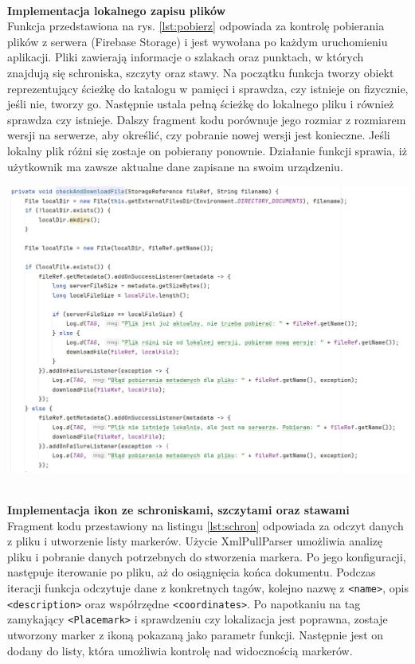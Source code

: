 \\


\textbf{Implementacja lokalnego zapisu plików} \\ 
Funkcja przedstawiona na rys. \ref{lst:pobierz} odpowiada za kontrolę pobierania plików z serwera (Firebase Storage) i jest wywołana po każdym uruchomieniu aplikacji. Pliki zawierają informacje o szlakach oraz punktach, w których znajdują się schroniska, szczyty oraz stawy. Na początku funkcja tworzy obiekt reprezentujący ścieżkę do katalogu w pamięci i sprawdza, czy istnieje on fizycznie, jeśli nie, tworzy go. Następnie ustala pełną ścieżkę do lokalnego pliku i również sprawdza czy istnieje. Dalszy fragment kodu porównuje jego rozmiar z rozmiarem wersji na serwerze, aby określić, czy pobranie nowej wersji jest konieczne. Jeśli lokalny plik różni się zostaje on pobierany ponownie. Działanie funkcji sprawia, iż użytkownik ma zawsze aktualne dane zapisane na swoim urządzeniu. 
\\

\noindent
\begin{minipage}{\linewidth}
    \label{lst:pobierz}
    \centering
    \includegraphics[width=0.8\linewidth]{img/kod/imp-ckeckandadd.jpg}
\end{minipage}\\

\textbf{Implementacja ikon ze schroniskami, szczytami oraz stawami} \\ 
Fragment kodu przestawiony na listingu \ref{lst:schron} odpowiada za odczyt danych z pliku i utworzenie listy markerów. Użycie XmlPullParser umożliwia analizę pliku i pobranie danych potrzebnych do stworzenia markera. Po jego konfiguracji, następuje iterowanie po pliku, aż do osiągnięcia końca dokumentu. Podczas iteracji funkcja odczytuje dane z konkretnych tagów, kolejno nazwę z \verb|<name>|, opis \verb|<description>| oraz współrzędne \verb|<coordinates>|. Po napotkaniu na tag zamykający \verb|<Placemark>| i sprawdzeniu czy lokalizacja jest poprawna, zostaje utworzony marker z ikoną pokazaną jako parametr funkcji. Następnie jest on dodany do listy, która umożliwia kontrolę nad widocznością markerów. \\

